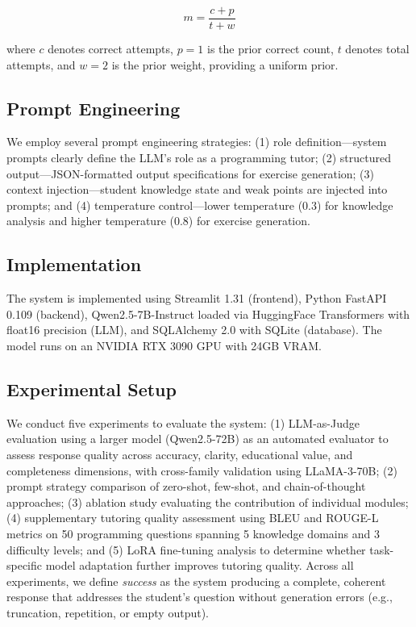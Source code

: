 \documentclass[applsci,article,submit,pdftex,moreauthors]{Definitions/mdpi}
\begin{document}
\begin{linenomath}
\begin{equation}
m = \frac{c + p}{t + w}
\end{equation}
\end{linenomath}

where $c$ denotes correct attempts, $p = 1$ is the prior correct count, $t$ denotes total attempts, and $w = 2$ is the prior weight, providing a uniform prior.

\subsection{Prompt Engineering}

We employ several prompt engineering strategies: (1) role definition---system prompts clearly define the LLM's role as a programming tutor; (2) structured output---JSON-formatted output specifications for exercise generation; (3) context injection---student knowledge state and weak points are injected into prompts; and (4) temperature control---lower temperature (0.3) for knowledge analysis and higher temperature (0.8) for exercise generation.

\subsection{Implementation}

The system is implemented using Streamlit 1.31 (frontend), Python FastAPI 0.109 (backend), Qwen2.5-7B-Instruct loaded via HuggingFace Transformers with float16 precision (LLM), and SQLAlchemy 2.0 with SQLite (database). The model runs on an NVIDIA RTX 3090 GPU with 24GB VRAM.

\subsection{Experimental Setup}

We conduct five experiments to evaluate the system: (1) LLM-as-Judge evaluation using a larger model (Qwen2.5-72B) as an automated evaluator to assess response quality across accuracy, clarity, educational value, and completeness dimensions, with cross-family validation using LLaMA-3-70B; (2) prompt strategy comparison of zero-shot, few-shot, and chain-of-thought approaches; (3) ablation study evaluating the contribution of individual modules; (4) supplementary tutoring quality assessment using BLEU and ROUGE-L metrics on 50 programming questions spanning 5 knowledge domains and 3 difficulty levels; and (5) LoRA fine-tuning analysis to determine whether task-specific model adaptation further improves tutoring quality. Across all experiments, we define \textit{success} as the system producing a complete, coherent response that addresses the student's question without generation errors (e.g., truncation, repetition, or empty output).
\end{document}
